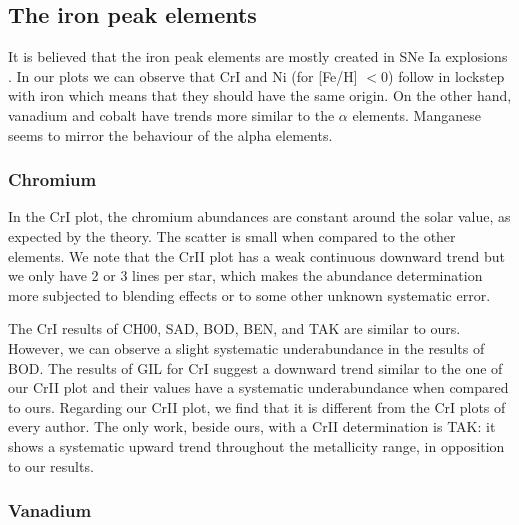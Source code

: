 \documentclass[oldversion]{aa}
\begin{document}
\subsection{The iron peak elements}

It is believed that the iron peak elements are mostly created in SNe Ia explosions \citep{Thielemann-2002}. %
In our plots we can observe that CrI and Ni (for [Fe/H] $<0$) follow in lockstep with iron which means that they should have the same origin. On the other hand, vanadium and cobalt have trends more similar to the $\alpha$ elements. Manganese seems to mirror the behaviour of the alpha elements. %


\subsubsection {Chromium}

In the CrI plot, the chromium abundances are constant around the solar value, as expected by the theory. The scatter is small when compared to the other elements. We note that the CrII plot has a weak continuous downward trend but we only have 2 or 3 lines per star, which makes the abundance determination more subjected to blending effects or to some other unknown systematic error.

The CrI results of CH00, SAD, BOD, BEN, and TAK are similar to ours. However, we can observe a slight systematic underabundance in the results of BOD. The results of GIL for CrI suggest a downward trend similar to the one of our CrII plot and their values have a systematic underabundance when compared to ours. Regarding our CrII plot, we find that it is different from the CrI plots of every author. The only work, beside ours, with a CrII determination is TAK: it shows a systematic upward trend throughout the metallicity range, in opposition to our results.


\subsubsection {Vanadium}
\end{document}
